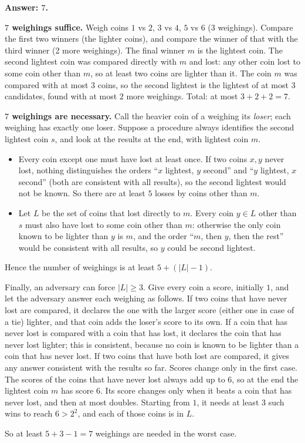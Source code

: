 \textbf{Answer: $\boxed{7}$.}

\textbf{$7$ weighings suffice.} Weigh coins $1$ vs $2$, $3$ vs $4$, $5$ vs $6$ (3 weighings). Compare the first two winners (the lighter coins), and compare the winner of that with the third winner (2 more weighings). The final winner $m$ is the lightest coin. The second lightest coin was compared directly with $m$ and lost: any other coin lost to some coin other than $m$, so at least two coins are lighter than it. The coin $m$ was compared with at most $3$ coins, so the second lightest is the lightest of at most $3$ candidates, found with at most $2$ more weighings. Total: at most $3+2+2=7$.

\textbf{$7$ weighings are necessary.} Call the heavier coin of a weighing its \emph{loser}; each weighing has exactly one loser. Suppose a procedure always identifies the second lightest coin $s$, and look at the results at the end, with lightest coin $m$.
\begin{itemize}
\item Every coin except one must have lost at least once. If two coins $x,y$ never lost, nothing distinguishes the orders ``$x$ lightest, $y$ second'' and ``$y$ lightest, $x$ second'' (both are consistent with all results), so the second lightest would not be known. So there are at least $5$ losses by coins other than $m$.
\item Let $L$ be the set of coins that lost directly to $m$. Every coin $y\in L$ other than $s$ must also have lost to some coin other than $m$: otherwise the only coin known to be lighter than $y$ is $m$, and the order ``$m$, then $y$, then the rest'' would be consistent with all results, so $y$ could be second lightest.
\end{itemize}
Hence the number of weighings is at least $5+(|L|-1)$.

Finally, an adversary can force $|L|\ge3$. Give every coin a score, initially $1$, and let the adversary answer each weighing as follows. If two coins that have never lost are compared, it declares the one with the larger score (either one in case of a tie) lighter, and that coin adds the loser's score to its own. If a coin that has never lost is compared with a coin that has lost, it declares the coin that has never lost lighter; this is consistent, because no coin is known to be lighter than a coin that has never lost. If two coins that have both lost are compared, it gives any answer consistent with the results so far. Scores change only in the first case. The scores of the coins that have never lost always add up to $6$, so at the end the lightest coin $m$ has score $6$. Its score changes only when it beats a coin that has never lost, and then at most doubles. Starting from $1$, it needs at least $3$ such wins to reach $6>2^2$, and each of those coins is in $L$.

So at least $5+3-1=7$ weighings are needed in the worst case.
